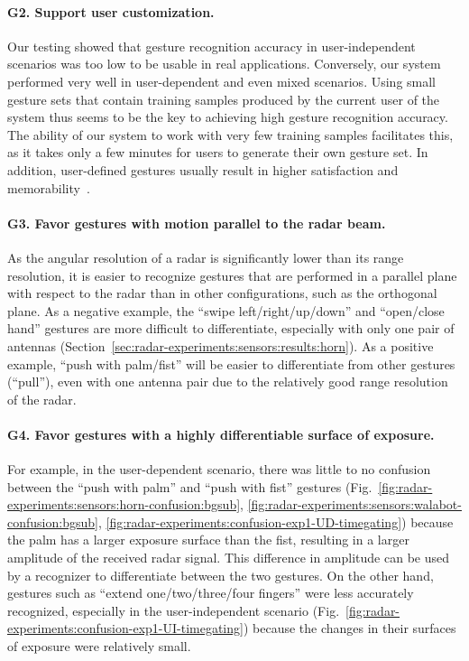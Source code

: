 \paragraph{G2. Support user customization.}
Our testing showed that gesture recognition accuracy in user-independent scenarios was too low to be usable in real applications. Conversely, our system performed very well in user-dependent and even mixed scenarios.
%
Using small gesture sets that contain training samples produced by the current user of the system thus seems to be the key to achieving high gesture recognition accuracy. The ability of our system to work with very few training samples facilitates this, as it takes only a few minutes for users to generate their own gesture set.
%
In addition, user-defined gestures usually result in higher satisfaction and memorability~\cite{Nacenta:2013}.

\paragraph{G3. Favor gestures with motion parallel to the radar beam.}
As the angular resolution of a radar is significantly lower than its range resolution, it is easier to recognize gestures that are performed in a parallel plane with respect to the radar than in other configurations, such as the orthogonal plane. As a negative example, the ``swipe left/right/up/down'' and ``open/close hand'' gestures are more difficult to differentiate, especially with only one pair of antennas (Section~\ref{sec:radar-experiments:sensors:results:horn}). As a positive example, ``push with palm/fist'' will be easier to differentiate from other gestures (\eg ``pull''), even with one antenna pair due to the relatively good range resolution of the radar.

\paragraph{G4. Favor gestures with a highly differentiable surface of exposure.} 
For example, in the user-dependent scenario, there was little to no confusion between the ``push with palm'' and ``push with fist'' gestures (Fig.~\ref{fig:radar-experiments:sensors:horn-confusion:bgsub}, \ref{fig:radar-experiments:sensors:walabot-confusion:bgsub}, \ref{fig:radar-experiments:confusion-exp1-UD-timegating}) because the palm has a larger exposure surface than the fist, resulting in a larger amplitude of the received radar signal. This difference in amplitude can be used by a recognizer to differentiate between the two gestures. On the other hand, gestures such as ``extend one/two/three/four fingers'' were less accurately recognized, especially in the user-independent scenario (Fig.~\ref{fig:radar-experiments:confusion-exp1-UI-timegating}) because the changes in their surfaces of exposure were relatively small.

